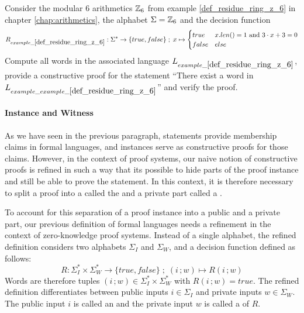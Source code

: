 \begin{exercise} Consider the modular $6$ arithmetics $\mathbb{Z}_6$ from  example \ref{def_residue_ring_z_6} in chapter \ref{chap:arithmetics}, the alphabet $\Sigma = \mathbb{Z}_6$ and the decision function
\begin{equation*}
R_{example\_\ref{def_residue_ring_z_6}} : \Sigma^*\to \{true, false\}\;;\;
x \mapsto
\begin{cases}
true & x.len()=1 \text{ and } 3\cdot x + 3 = 0\\
false & else
\end{cases}
\end{equation*}
Compute all words in the associated language $L_{example\_\ref{def_residue_ring_z_6}}$, provide a constructive proof for the statement ``There exist a word in $L_{example\_ example\_\ref{def_residue_ring_z_6}}$'' and verify the proof.
\end{exercise}
\paragraph{Instance and Witness}
As we have seen in the previous paragraph, statements provide membership claims in formal languages, and instances serve as constructive proofs for those claims. However, in the context of  proof systems, our naive notion of constructive proofs is refined in such a way that  its possible to hide parts of the proof instance and still be able to prove the statement. In this context, it is therefore necessary to split a proof into a  called the  and a private part called a .

To account for this separation of a proof instance into a public and a private part, our previous definition of formal languages needs a refinement in the context of zero-knowledge proof systems. Instead of a single alphabet, the refined definition considers two alphabets $\Sigma_I$ and $\Sigma_W$, and a decision function defined as follows:
\begin{equation}
R: \Sigma_I^* \times \Sigma_W^* \to \{true, false\}\;;\; (i\,;w) \mapsto R(i\,;w)
\end{equation}
Words are therefore tuples $(i\,;w)\in \Sigma_I^* \times \Sigma_W^*$ with $R(i\,;w)=true$. The refined definition differentiates between public inputs $i\in \Sigma_I$ and private inputs $w\in \Sigma_W$. The public input $i$ is called an  and the private input $w$ is called a  of $R$. 

